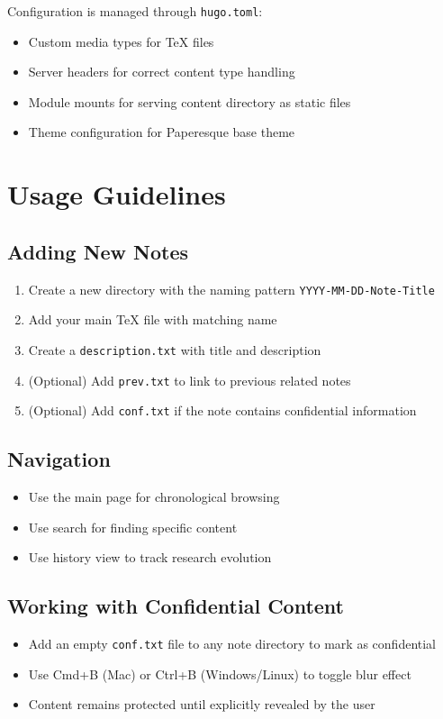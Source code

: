 \documentclass{article}
\begin{document}
Configuration is managed through \texttt{hugo.toml}:

\begin{itemize}
  \item Custom media types for TeX files
  \item Server headers for correct content type handling
  \item Module mounts for serving content directory as static files
  \item Theme configuration for Paperesque base theme
\end{itemize}

\section{Usage Guidelines}

\subsection{Adding New Notes}
\begin{enumerate}
  \item Create a new directory with the naming pattern \texttt{YYYY-MM-DD-Note-Title}
  \item Add your main TeX file with matching name
  \item Create a \texttt{description.txt} with title and description
  \item (Optional) Add \texttt{prev.txt} to link to previous related notes
  \item (Optional) Add \texttt{conf.txt} if the note contains confidential information
\end{enumerate}

\subsection{Navigation}
\begin{itemize}
  \item Use the main page for chronological browsing
  \item Use search for finding specific content
  \item Use history view to track research evolution
\end{itemize}

\subsection{Working with Confidential Content}
\begin{itemize}
  \item Add an empty \texttt{conf.txt} file to any note directory to mark as confidential
  \item Use Cmd+B (Mac) or Ctrl+B (Windows/Linux) to toggle blur effect
  \item Content remains protected until explicitly revealed by the user
\end{itemize}
\end{document}
